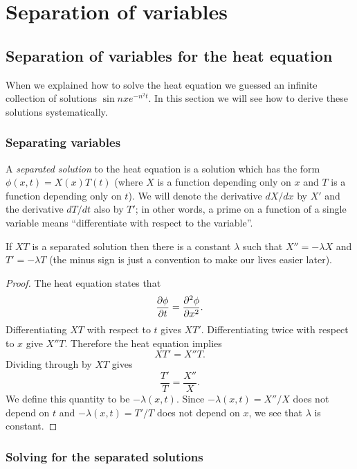 \chapter{Separation of variables}

\section{Separation of variables for the heat equation}

When we explained how to solve the heat equation we guessed an infinite collection of solutions $\sin nx e^{-n^2t}$. In this section we will see how to derive these solutions systematically.

\subsection{Separating variables}

\begin{dfn}
A {\em separated solution} to the heat equation is a solution which has the form $\phi(x,t)=X(x)T(t)$ (where $X$ is a function depending only on $x$ and $T$ is a function depending only on $t$). We will denote the derivative $dX/dx$ by $X'$ and the derivative $dT/dt$ also by $T'$; in other words, a prime on a function of a single variable means ``differentiate with respect to the variable''.
\end{dfn}

\begin{lma}\label{lma:sepvar}
If $XT$ is a separated solution then there is a constant $\lambda$ such that $X''=-\lambda X$ and $T'=-\lambda T$ (the minus sign is just a convention to make our lives easier later).
\end{lma}
\begin{proof}
The heat equation states that
\[\frac{\partial \phi}{\partial t}=\frac{\partial^2 \phi}{\partial x ^2}.\]
Differentiating $XT$ with respect to $t$ gives $XT'$. Differentiating twice with respect to $x$ give $X''T$. Therefore the heat equation implies
\[XT'=X''T.\]
Dividing through by $XT$ gives
\[\frac{T'}{T}=\frac{X''}{X}.\]
We define this quantity to be $-\lambda(x,t)$. Since $-\lambda(x,t)=X''/X$ does not depend on $t$ and $-\lambda(x,t)=T'/T$ does not depend on $x$, we see that $\lambda$ is constant.
\end{proof}

\subsection{Solving for the separated solutions}

